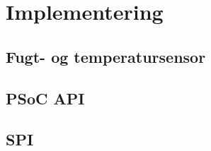 \chapter{Implementering}


\section{Fugt- og temperatursensor}


\section{PSoC API}


\section{SPI}



